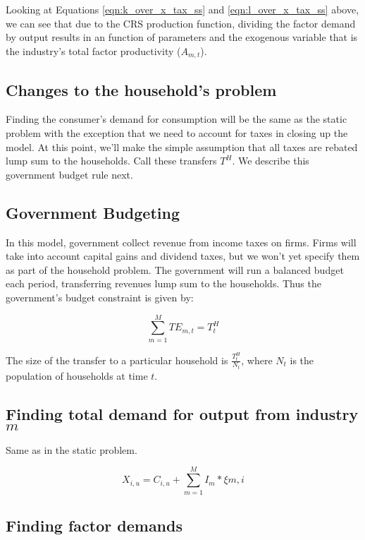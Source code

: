 \documentclass[letterpaper,12pt]{article}
\theoremstyle{definition}
\begin{document}
\begin{spacing}{1.5}
Looking at Equations \ref{eqn:k_over_x_tax_ss} and \ref{eqn:l_over_x_tax_ss} above, we can see that due to the CRS production function, dividing the factor demand by output results in an function of parameters and the exogenous variable that is the industry's total factor productivity ($A_{m,t}$).


\subsection*{Changes to the household's problem}

Finding the consumer's demand for consumption will be the same as the static problem with the exception that we need to account for taxes in closing up the model.  At this point, we'll make the simple assumption that all taxes are rebated lump sum to the households.  Call these transfers $T^{H}$.  We describe this government budget rule next.

\subsection*{Government Budgeting}

In this model, government collect revenue from income taxes on firms.  Firms will take into account capital gains and dividend taxes, but we won't yet specify them as part of the household problem.  The government will run a balanced budget each period, transferring revenues lump sum to the households.  Thus the government's budget constraint is given by: 

\begin{equation}
\sum_{m=1}^{M}TE_{m,t} = T^{H}_{t}
\end{equation}

The size of the transfer to a particular household is $\frac{T^{H}_{t}}{N_{t}}$, where $N_{t}$ is the population of households at time $t$.

\subsection*{Finding total demand for output from industry $m$}

Same as in the static problem.

\begin{equation}
\label{eqn:output_demand_dyn_tax_ss}
X_{i,u} = C_{i,u} + \sum_{m=1}^{M}I_{m}*\xi{m,i}
\end{equation}

\subsection*{Finding factor demands}


\end{spacing}
\end{document}
